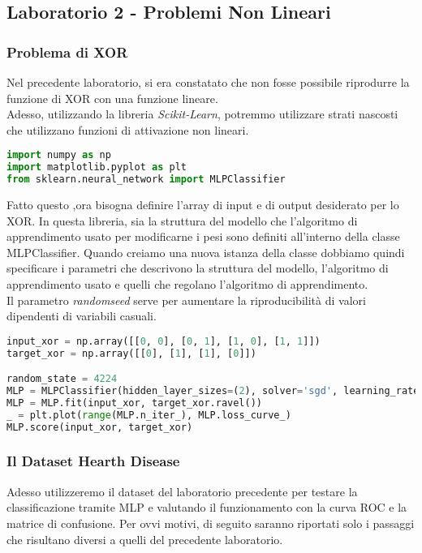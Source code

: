 \subsection{Laboratorio 2 - Problemi Non Lineari}
\subsubsection{Problema di XOR}
Nel precedente laboratorio, si era constatato che non fosse possibile riprodurre la funzione di XOR con una funzione lineare.\\
Adesso, utilizzando la libreria \textit{Scikit-Learn}, potremmo utilizzare strati nascosti che utilizzano funzioni di attivazione non lineari.

\begin{lstlisting}[language=Python, caption=Importazione delle Librerie Necessarie]
import numpy as np 
import matplotlib.pyplot as plt
from sklearn.neural_network import MLPClassifier   
\end{lstlisting}

Fatto questo ,ora bisogna definire l'array di input e di output desiderato per lo XOR.
In questa libreria, sia la struttura del modello che l'algoritmo di apprendimento usato per modificarne i pesi sono definiti all'interno della classe MLPClassifier. Quando creiamo una nuova istanza della classe dobbiamo quindi specificare i parametri che descrivono la struttura del modello, l'algoritmo di apprendimento usato e quelli che regolano l'algoritmo di apprendimento.\\
Il parametro \textit{random\textunderscore seed} serve per aumentare la riproducibilità di valori dipendenti di variabili casuali.

\begin{lstlisting}[language=Python, caption=Inizializzazione]
input_xor = np.array([[0, 0], [0, 1], [1, 0], [1, 1]])
target_xor = np.array([[0], [1], [1], [0]])    

random_state = 4224
MLP = MLPClassifier(hidden_layer_sizes=(2), solver='sgd', learning_rate_init=0.05, max_iter=10000, random_state=random_state)
MLP = MLP.fit(input_xor, target_xor.ravel())
_ = plt.plot(range(MLP.n_iter_), MLP.loss_curve_)
MLP.score(input_xor, target_xor)
\end{lstlisting}

\subsubsection{Il Dataset Hearth Disease}
Adesso utilizzeremo il dataset del laboratorio precedente per testare la classificazione tramite MLP e valutando il funzionamento con la curva ROC e la matrice di confusione.
Per ovvi motivi, di seguito saranno riportati solo i passaggi che risultano diversi a quelli del precedente laboratorio.

